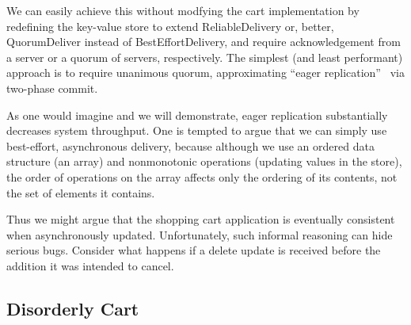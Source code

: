 We can easily achieve this without modfying the cart implementation
by redefining the key-value store to extend
ReliableDelivery or, better, QuorumDeliver instead of BestEffortDelivery, and require acknowledgement from a server or a quorum of servers, respectively.
The simplest (and least performant) approach is to require unanimous quorum,
approximating ``eager replication''~\cite{dangers} via two-phase commit.

As one would imagine and we will demonstrate, 
eager replication substantially decreases system throughput.  One is tempted
to argue that we can simply use best-effort, asynchronous delivery,
because although we use an ordered data structure (an array) and nonmonotonic
operations (updating values in the store), the order of operations on the array
affects only the ordering of its contents, not the set of elements it contains.

Thus we might argue that the shopping cart application is eventually consistent
when asynchronously updated.  Unfortunately, such informal reasoning can
hide serious bugs.  Consider what happens if a delete update is received
before the addition it was intended to cancel.


\subsection{Disorderly Cart}


